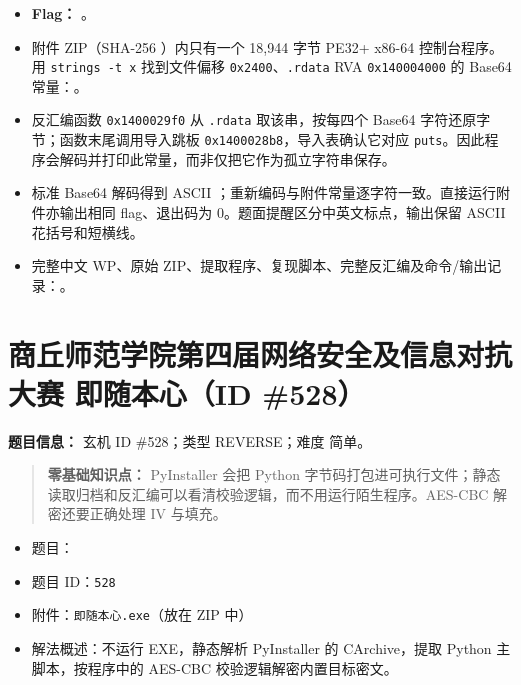 \begin{itemize}
\tightlist
\item
  \textbf{Flag：} \texttt{}。
\item
  附件 ZIP（SHA-256 \texttt{}）内只有一个 18,944 字节 PE32+ x86-64 控制台程序。用 \texttt{strings\ -t\ x} 找到文件偏移 \texttt{0x2400}、\texttt{.rdata} RVA \texttt{0x140004000} 的 Base64 常量：\texttt{}。
\item
  反汇编函数 \texttt{0x1400029f0} 从 \texttt{.rdata} 取该串，按每四个 Base64 字符还原字节；函数末尾调用导入跳板 \texttt{0x1400028b8}，导入表确认它对应 \texttt{puts}。因此程序会解码并打印此常量，而非仅把它作为孤立字符串保存。
\item
  标准 Base64 解码得到 ASCII \texttt{}；重新编码与附件常量逐字符一致。直接运行附件亦输出相同 flag、退出码为 0。题面提醒区分中英文标点，输出保留 ASCII 花括号和短横线。
\item
  完整中文 WP、原始 ZIP、提取程序、复现脚本、完整反汇编及命令/输出记录：\texttt{}。
\end{itemize}

\section{商丘师范学院第四届网络安全及信息对抗大赛 即随本心（ID \#528）}\label{ux5546ux4e18ux5e08ux8303ux5b66ux9662ux7b2cux56dbux5c4aux7f51ux7edcux5b89ux5168ux53caux4fe1ux606fux5bf9ux6297ux5927ux8d5b-ux5373ux968fux672cux5fc3id-528}

\textbf{题目信息：} 玄机 ID \#528；类型 REVERSE；难度 简单。

\begin{quote}
\textbf{零基础知识点：} PyInstaller 会把 Python 字节码打包进可执行文件；静态读取归档和反汇编可以看清校验逻辑，而不用运行陌生程序。AES-CBC 解密还要正确处理 IV 与填充。
\end{quote}

\begin{itemize}
\tightlist
\item
  题目：\texttt{}
\item
  题目 ID：\texttt{528}
\item
  附件：\texttt{即随本心.exe}（放在 ZIP 中）
\item
  解法概述：不运行 EXE，静态解析 PyInstaller 的 CArchive，提取 Python 主脚本，按程序中的 AES-CBC 校验逻辑解密内置目标密文。
\end{itemize}

